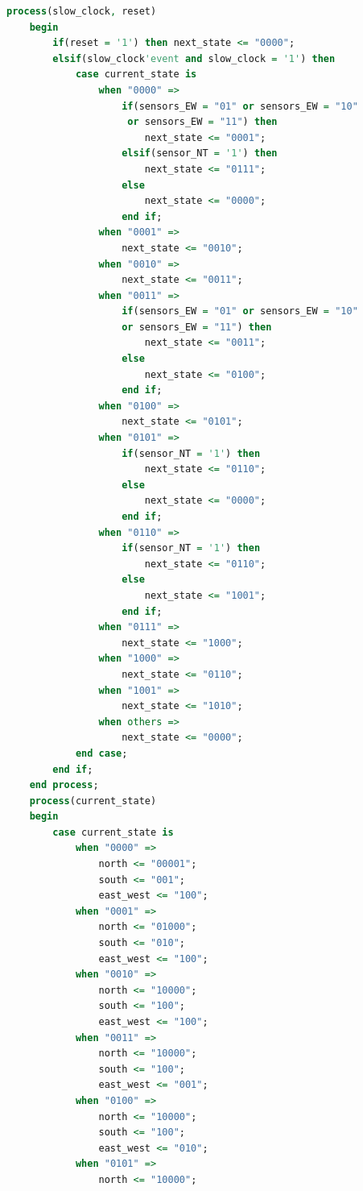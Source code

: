 \documentclass[11pt]{article}
\begin{document}
\begin{appendices}
\begin{lstlisting}[language=VHDL]
    process(slow_clock, reset)
    begin
        if(reset = '1') then next_state <= "0000";
        elsif(slow_clock'event and slow_clock = '1') then
            case current_state is
                when "0000" =>
                    if(sensors_EW = "01" or sensors_EW = "10"
                     or sensors_EW = "11") then
                        next_state <= "0001";
                    elsif(sensor_NT = '1') then 
                        next_state <= "0111";
                    else
                        next_state <= "0000";
                    end if;
                when "0001" =>
                    next_state <= "0010";
                when "0010" =>
                    next_state <= "0011";
                when "0011" =>
                    if(sensors_EW = "01" or sensors_EW = "10" 
                    or sensors_EW = "11") then
                        next_state <= "0011";
                    else
                        next_state <= "0100";
                    end if;
                when "0100" =>
                    next_state <= "0101";
                when "0101" =>
                    if(sensor_NT = '1') then
                        next_state <= "0110";
                    else
                        next_state <= "0000";
                    end if;
                when "0110" =>
                    if(sensor_NT = '1') then
                        next_state <= "0110";
                    else
                        next_state <= "1001";
                    end if;
                when "0111" =>
                    next_state <= "1000";
                when "1000" =>
                    next_state <= "0110";
                when "1001" =>
                    next_state <= "1010";
                when others =>
                    next_state <= "0000";
            end case;
        end if;
    end process;
    process(current_state)
    begin
        case current_state is
            when "0000" =>
                north <= "00001";
                south <= "001";
                east_west <= "100";
            when "0001" =>
                north <= "01000";
                south <= "010";
                east_west <= "100";
            when "0010" =>
                north <= "10000";
                south <= "100";
                east_west <= "100";
            when "0011" =>
                north <= "10000";
                south <= "100";
                east_west <= "001";
            when "0100" =>
                north <= "10000";
                south <= "100";
                east_west <= "010";
            when "0101" =>
                north <= "10000";

\end{lstlisting}
\end{appendices}
\end{document}
